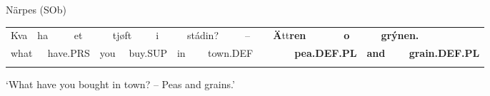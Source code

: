 \begin{listWWNumileveli}
\item {}

\begin{styleExample}
Närpes (SOb)

\end{styleExample}

\end{listWWNumileveli}

\begin{tabular}{llllllllllllllllllll}
\lsptoprule
Kva & \multicolumn{2}{l}{ha

} & \multicolumn{2}{l}{et

} & \multicolumn{2}{l}{tjøft

} & \multicolumn{2}{l}{i

} & \multicolumn{2}{l}{stádin?

} & \multicolumn{2}{l}{–

} & \multicolumn{2}{l}{\textbf{Ä}tt\textbf{ren}

} & \multicolumn{2}{l}{{\bfseries o}

} & \multicolumn{2}{l}{{\bfseries grýnen.}

} & \\
\multicolumn{2}{l}{what

} & \multicolumn{2}{l}{have.PRS

} & \multicolumn{2}{l}{you

} & \multicolumn{2}{l}{buy.SUP

} & \multicolumn{2}{l}{in

} & \multicolumn{2}{l}{town.DEF

} & \multicolumn{2}{l}{} & \multicolumn{2}{l}{{\bfseries pea.DEF.PL}

} & \multicolumn{2}{l}{{\bfseries and}

} & \multicolumn{2}{l}{{\bfseries grain.DEF.PL}

}\\
\lspbottomrule
\end{tabular}

\begin{styleTranslation}
‘What have you bought in town? – Peas and grains.’

\end{styleTranslation}

